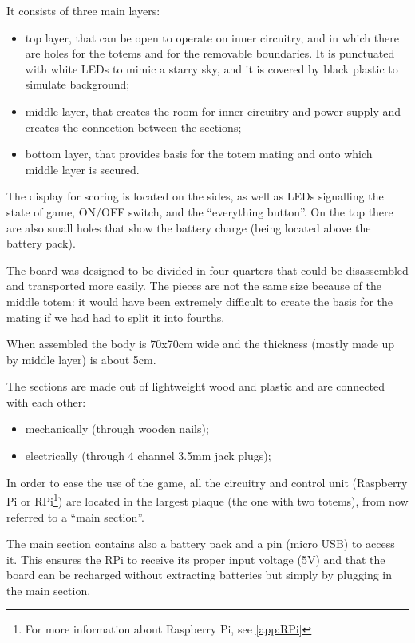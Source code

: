 \documentclass[a4paper,twoside]{book}
\begin{document}
\beforelist It consists of three main layers:
\begin{itemize}
\item top layer, that can be open to operate on inner circuitry, and in which there are holes for the totems and for the removable boundaries. It is punctuated with white LEDs to mimic a starry sky, and it is covered by black plastic to simulate background;
\item middle layer, that creates the room for inner circuitry and power supply and creates the connection between the sections;
\item bottom layer, that provides basis for the totem mating and onto which middle layer is secured.
\end{itemize}
\afterlist*
The display for scoring is located on the sides, as well as LEDs signalling the state of game, ON/OFF switch, and the \textquotedblleft everything button\textquotedblright. On the top there are also small holes that show the battery charge (being located above the battery pack).

The board was designed to be divided in four quarters that could be disassembled and transported more easily. The pieces are not the same size because of the middle totem: it would have been extremely difficult to create the basis for the  mating if we had had to split it into fourths.

When assembled the body is 70x70cm wide and the thickness (mostly made up by middle layer) is about 5cm.

\beforelist* The sections are made out of lightweight wood and plastic and are connected with each other:
\begin{itemize}
\item mechanically (through wooden nails);
\item electrically (through 4 channel 3.5mm jack plugs);
\end{itemize}
\afterlist*
In order to ease the use of the game, all the circuitry and control unit (Raspberry Pi or RPi\footnote{For more information about Raspberry Pi, see \autoref{app:RPi}}) are located in the largest plaque (the one with two totems), from now referred to a \textquotedblleft main section\textquotedblright .

The main section contains also a battery pack and a pin (micro USB) to access it. This ensures the RPi to receive its proper input voltage (5V) and that the board can be recharged without extracting batteries but simply by plugging in the main section.
\end{document}
